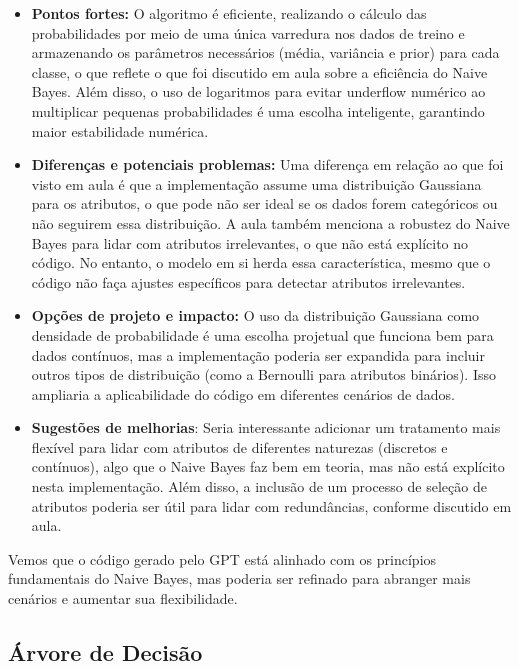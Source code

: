 \documentclass[12pt]{article}
\begin{document}
\begin{itemize}
    \item \textbf{Pontos fortes:} O algoritmo é eficiente, realizando o cálculo das probabilidades por meio de uma única varredura nos dados de treino e armazenando os parâmetros necessários (média, variância e prior) para cada classe, o que reflete o que foi discutido em aula sobre a eficiência do Naive Bayes. Além disso, o uso de logaritmos para evitar underflow numérico ao multiplicar pequenas probabilidades é uma escolha inteligente, garantindo maior estabilidade numérica.
    
    \item \textbf{Diferenças e potenciais problemas:} Uma diferença em relação ao que foi visto em aula é que a implementação assume uma distribuição Gaussiana para os atributos, o que pode não ser ideal se os dados forem categóricos ou não seguirem essa distribuição. A aula também menciona a robustez do Naive Bayes para lidar com atributos irrelevantes, o que não está explícito no código. No entanto, o modelo em si herda essa característica, mesmo que o código não faça ajustes específicos para detectar atributos irrelevantes.
    
    \item \textbf{Opções de projeto e impacto:} O uso da distribuição Gaussiana como densidade de probabilidade é uma escolha projetual que funciona bem para dados contínuos, mas a implementação poderia ser expandida para incluir outros tipos de distribuição (como a Bernoulli para atributos binários). Isso ampliaria a aplicabilidade do código em diferentes cenários de dados.
    
    \item \textbf{Sugestões de melhorias}: Seria interessante adicionar um tratamento mais flexível para lidar com atributos de diferentes naturezas (discretos e contínuos), algo que o Naive Bayes faz bem em teoria, mas não está explícito nesta implementação. Além disso, a inclusão de um processo de seleção de atributos poderia ser útil para lidar com redundâncias, conforme discutido em aula.
\end{itemize}

Vemos que o código gerado pelo GPT está alinhado com os princípios fundamentais do Naive Bayes, mas poderia ser refinado para abranger mais cenários e aumentar sua flexibilidade.

\subsection{Árvore de Decisão}
\end{document}

